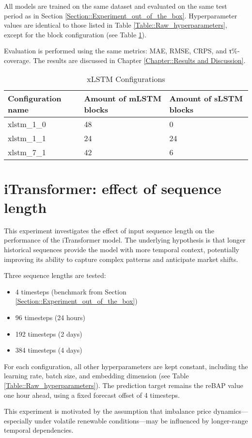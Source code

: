 \documentclass[class=scrbook, crop=false]{standalone}
\begin{document}
All models are trained on the same dataset and evaluated on the same test period as in Section \ref{Section::Experiment_out_of_the_box}. Hyperparameter values are identical to those listed in Table \ref{Table::Raw_hyperparameters}, except for the block configuration (see Table \ref{Table::xLSTM_configuratiosn}).

Evaluation is performed using the same metrics: MAE, RMSE, CRPS, and τ\%-coverage. The results are discussed in Chapter \ref{Chapter::Results and Discussion}.


  \begin{table}[]
\centering
\begin{tabular}{l|l|l}
 Configuration name & Amount of mLSTM blocks & Amount of sLSTM blocks  \\\hline
 xlstm\_1\_0 & 48 & 0 \\
 xlstm\_1\_1 & 24 & 24 \\
 xlstm\_7\_1  & 42 & 6 
\end{tabular}
\caption{xLSTM Configurations}
\label{Table::xLSTM_configuratiosn}
\end{table}
   
\section{iTransformer: effect of sequence length}
This experiment investigates the effect of input sequence length on the performance of the iTransformer model. The underlying hypothesis is that longer historical sequences provide the model with more temporal context, potentially improving its ability to capture complex patterns and anticipate market shifts.

Three sequence lengths are tested:
\begin{itemize}
\item 4 timesteps (benchmark from Section \ref{Section::Experiment_out_of_the_box})
\item 96 timesteps (24 hours)
\item 192 timesteps (2 days)
\item  384 timesteps (4 days)
\end{itemize}

For each configuration, all other hyperparameters are kept constant, including the learning rate, batch size, and embedding dimension (see Table \ref{Table::Raw_hyperparameters}). The prediction target remains the reBAP value one hour ahead, using a fixed forecast offset of 4 timesteps.

This experiment is motivated by the assumption that imbalance price dynamics—especially under volatile renewable conditions—may be influenced by longer-range temporal dependencies.
\end{document}
